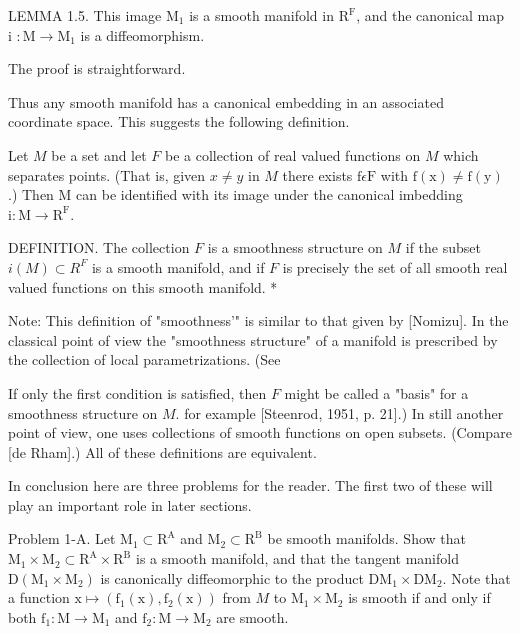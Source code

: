 \documentclass[10pt]{article}
\begin{document}
LEMMA 1.5. This image $\mathrm{M}_{1}$ is a smooth manifold in $\mathrm{R}^{\mathrm{F}}$, and the canonical map i $: \mathrm{M} \rightarrow \mathrm{M}_{1}$ is a diffeomorphism.

The proof is straightforward.

Thus any smooth manifold has a canonical embedding in an associated coordinate space. This suggests the following definition.

Let $M$ be a set and let $F$ be a collection of real valued functions on $M$ which separates points. (That is, given $x \neq y$ in $M$ there exists $\mathrm{f} \epsilon \mathrm{F}$ with $\mathrm{f}(\mathrm{x}) \neq \mathrm{f}(\mathrm{y})$.) Then $\mathrm{M}$ can be identified with its image under the canonical imbedding $\mathrm{i}: \mathrm{M} \rightarrow \mathrm{R}^{\mathrm{F}}$.

DEFINITION. The collection $F$ is a smoothness structure on $M$ if the subset $i(M) \subset R^{F}$ is a smooth manifold, and if $F$ is precisely the set of all smooth real valued functions on this smooth manifold. *

Note: This definition of "smoothness'" is similar to that given by [Nomizu]. In the classical point of view the "smoothness structure" of a manifold is prescribed by the collection of local parametrizations. (See

If only the first condition is satisfied, then $F$ might be called a "basis" for a smoothness structure on $M$. for example [Steenrod, 1951, p. 21].) In still another point of view, one uses collections of smooth functions on open subsets. (Compare [de Rham].) All of these definitions are equivalent.

In conclusion here are three problems for the reader. The first two of these will play an important role in later sections.

Problem 1-A. Let $\mathrm{M}_{1} \subset \mathrm{R}^{\mathrm{A}}$ and $\mathrm{M}_{2} \subset \mathrm{R}^{\mathrm{B}}$ be smooth manifolds. Show that $\mathrm{M}_{1} \times \mathrm{M}_{2} \subset \mathrm{R}^{\mathrm{A}} \times \mathrm{R}^{\mathrm{B}}$ is a smooth manifold, and that the tangent manifold $\mathrm{D}\left(\mathrm{M}_{1} \times \mathrm{M}_{2}\right)$ is canonically diffeomorphic to the product $\mathrm{DM}_{1} \times \mathrm{DM}_{2}$. Note that a function $\mathrm{x} \mapsto\left(\mathrm{f}_{1}(\mathrm{x}), \mathrm{f}_{2}(\mathrm{x})\right)$ from $M$ to $\mathrm{M}_{1} \times \mathrm{M}_{2}$ is smooth if and only if both $\mathrm{f}_{1}: \mathrm{M} \rightarrow \mathrm{M}_{1}$ and $\mathrm{f}_{2}: \mathrm{M} \rightarrow \mathrm{M}_{2}$ are smooth.
\end{document}
